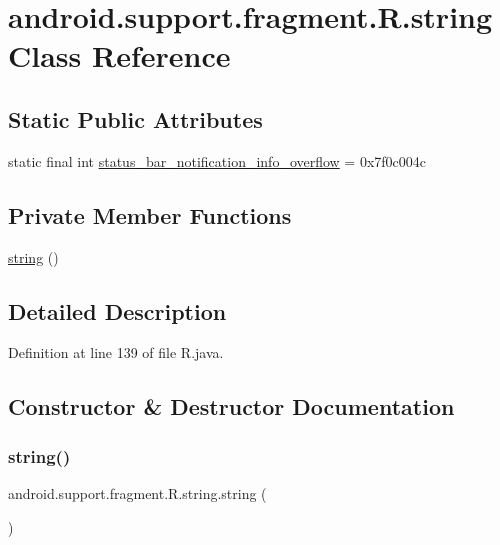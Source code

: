 \hypertarget{classandroid_1_1support_1_1fragment_1_1_r_1_1string}{}\section{android.\+support.\+fragment.\+R.\+string Class Reference}
\label{classandroid_1_1support_1_1fragment_1_1_r_1_1string}
\subsection*{Static Public Attributes}
\begin{DoxyCompactItemize}
\item 
static final int \mbox{\hyperlink{classandroid_1_1support_1_1fragment_1_1_r_1_1string_afe54f0256b7cd91c2b0175f6dd55f9cc}{status\+\_\+bar\+\_\+notification\+\_\+info\+\_\+overflow}} = 0x7f0c004c
\end{DoxyCompactItemize}
\subsection*{Private Member Functions}
\begin{DoxyCompactItemize}
\item 
\mbox{\hyperlink{classandroid_1_1support_1_1fragment_1_1_r_1_1string_a755e96c4ca3e1d47b45d1ada149a3285}{string}} ()
\end{DoxyCompactItemize}


\subsection{Detailed Description}


Definition at line 139 of file R.\+java.



\subsection{Constructor \& Destructor Documentation}
\mbox{\label{classandroid_1_1support_1_1fragment_1_1_r_1_1string_a755e96c4ca3e1d47b45d1ada149a3285}} 
\subsubsection{\texorpdfstring{string()}{string()}}
{\footnotesize\ttfamily android.\+support.\+fragment.\+R.\+string.\+string (\begin{DoxyParamCaption}{ }\end{DoxyParamCaption})\hspace{0.3cm}{\ttfamily [private]}}



